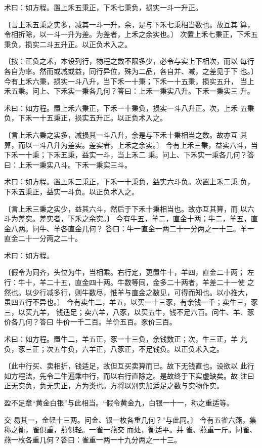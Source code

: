 \documentclass[a4paper,12pt,UTF8,twoside]{ctexbook}
\begin{document}
术曰：如方程。置上禾五秉正，下禾七秉负，损实一斗一升正。

〔言上禾五秉之实多，减其一斗一升，余，是与下禾七秉相当数也。故互其 算，令相折除，以一斗一升为差。为差者，上禾之余实也。〕 次置上禾七秉正，下禾五秉负，损实二斗五升正。以正负术入之。

〔按：正负之术，本设列行，物程之数不限多少，必令与实上下相次，而以 每行各自为率。然而或减或益，同行异位，殊为二品，各自并、减，之差见于下 也。〕 今有上禾六秉，损实一斗八升，当下禾一十秉；下禾一十五秉，损实五升， 当上禾五秉。问上、下禾实一秉各几何？答曰：上禾一秉实八升。下禾一秉实三 升。

术曰：如方程。置上禾六秉正，下禾一十秉负，损实一斗八升正。次，上禾 五秉负，下禾一十五秉正，损实五升正。以正负术入之。

〔言上禾六秉之实多，减损其一斗八升，余是与下禾十秉相当之数。故亦互 其算，而以一斗八升为差实。差实者，上禾之余实。〕 今有上禾三秉，益实六斗，当下禾一十秉；下禾五秉，益实一斗，当上禾二 秉。问上、下禾实一秉各几何？答曰：上禾一秉实八斗。下禾一秉实三斗。

术曰：如方程。置上禾三秉正，下禾一十秉负，益实六斗负。次置上禾二秉 负，下禾五秉正，益实一斗负。以正负术入之。

〔言上禾三秉之实少，益其六斗，然后于下禾十秉相当也。故亦互其算，而 以六斗为差实。差实者，下禾之余实。〕 今有牛五，羊二，直金十两；牛二，羊五，直金八两。问牛、羊各直金几何？ 答曰：牛一直金一两二十一分两之一十三。羊一直金二十一分两之二十。

术曰：如方程。

〔假令为同齐，头位为牛，当相乘。右行定，更置牛十，羊四，直金二十两； 左行：牛十，羊二十五，直金四十两。牛数等同，金多二十两者，羊差二十一使 之然也。以少行减多行，则牛数尽，惟羊与直金之数见，可得而知也。以小推大， 虽四五行不异也。〕 今有卖牛二，羊五，以买一十三豕，有余钱一千；卖牛三，豕三，以买九羊， 钱适足；卖六羊，八豕，以买五牛，钱不足六百。问牛、羊、豕价各几何？答曰 牛价一千二百。羊价五百。豕价三百。

术曰：如方程。置牛二，羊五正，豕一十三负，余钱数正；次，牛三正，羊 九负，豕三正；次五牛负，六羊正，八豕正，不足钱负。以正负术入之。

〔此中行买、卖相折，钱适足，故但互买卖算而已。故下无钱直也。设欲以 此行如方程法，先令二牛遍乘中行，而以右行直除之。是故终于下实虚缺矣。故 注曰正无实负，负无实正，方为类也。方将以别实加适足之数与实物作实。

盈不足章“黄金白银”与此相当。“假令黄金九，白银一十一，称之重适等。

交 易其一，金轻十三两。问金、银一枚各重几何？”与此同。〕 今有五雀六燕，集称之衡，雀俱重，燕俱轻。一雀一燕交 而处，衡适平。并 雀、燕重一斤。问雀、燕一枚各重几何？答曰：雀重一两一十九分两之一十三。
\end{document}
